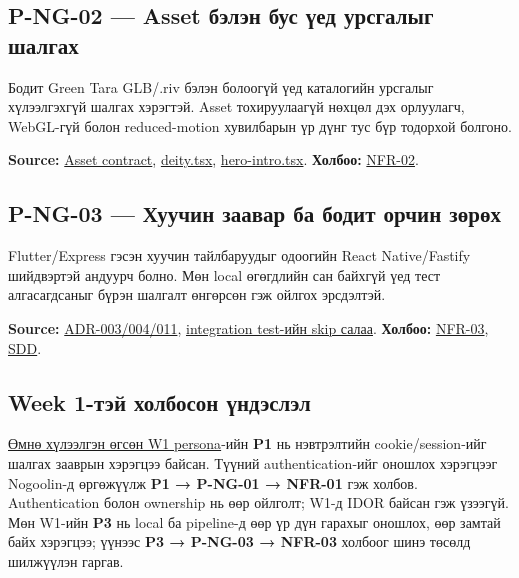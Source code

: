 \documentclass[
  11pt,
  a4paper,
]{article}
\begin{document}
\subsection{P-NG-02 --- Asset бэлэн бус үед урсгалыг
шалгах}\label{doc2-p-ng-02-asset-ux431ux44dux43bux44dux43d-ux431ux443ux441-ux4afux435ux434-ux443ux440ux441ux433ux430ux43bux44bux433-ux448ux430ux43bux433ux430ux445}

Бодит Green Tara GLB/.riv бэлэн болоогүй үед каталогийн урсгалыг
хүлээлгэхгүй шалгах хэрэгтэй. Asset тохируулаагүй нөхцөл дэх орлуулагч,
WebGL-гүй болон reduced-motion хувилбарын үр дүнг тус бүр тодорхой
болгоно.

\textbf{Source:} \href{../../../agent-context/ASSET_SPECS.md}{Asset
contract},
\href{../../../apps/web/src/components/intro/deity.tsx}{deity.tsx},
\href{../../../apps/web/src/components/intro/hero-intro.tsx}{hero-intro.tsx}.
\textbf{Холбоо:}
\href{../../requirements/requirements.md\#nfr-02}{NFR-02}.

\subsection{P-NG-03 --- Хуучин заавар ба бодит орчин
зөрөх}\label{doc2-p-ng-03-ux445ux443ux443ux447ux438ux43d-ux437ux430ux430ux432ux430ux440-ux431ux430-ux431ux43eux434ux438ux442-ux43eux440ux447ux438ux43d-ux437ux4e9ux440ux4e9ux445}

Flutter/Express гэсэн хуучин тайлбаруудыг одоогийн React Native/Fastify
шийдвэртэй андуурч болно. Мөн local өгөгдлийн сан байхгүй үед тест
алгасагдсаныг бүрэн шалгалт өнгөрсөн гэж ойлгох эрсдэлтэй.

\textbf{Source:}
\href{../../../agent-context/DECISIONS.md}{ADR-003/004/011},
\href{../../../backend/api/tests/inquiry-cart.integration.test.ts}{integration
test-ийн skip салаа}. \textbf{Холбоо:}
\href{../../requirements/requirements.md\#nfr-03}{NFR-03},
\href{../../architecture/sdd-template.md}{SDD}.

\subsection{Week 1-тэй холбосон
үндэслэл}\label{doc2-week-1-ux442ux44dux439-ux445ux43eux43bux431ux43eux441ux43eux43d-ux4afux43dux434ux44dux441ux43bux44dux43b}

\href{../sem1/wiki/02_audience_persona.md}{Өмнө хүлээлгэн өгсөн W1
persona}-ийн \textbf{P1} нь нэвтрэлтийн cookie/session-ийг шалгах
зааврын хэрэгцээ байсан. Түүний authentication-ийг оношлох хэрэгцээг
Nogoolin-д өргөжүүлж \textbf{P1 → P-NG-01 → NFR-01} гэж холбов.
Authentication болон ownership нь өөр ойлголт; W1-д IDOR байсан гэж
үзээгүй. Мөн W1-ийн \textbf{P3} нь local ба pipeline-д өөр үр дүн
гарахыг оношлох, өөр замтай байх хэрэгцээ; үүнээс \textbf{P3 → P-NG-03 →
NFR-03} холбоог шинэ төсөлд шилжүүлэн гаргав.
\end{document}
